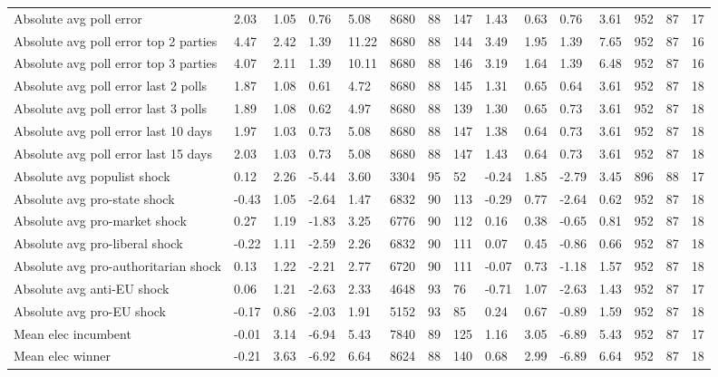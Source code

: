 \begin{longtable}{lllllllllllllll}
Absolute avg poll error & 2.03 & 1.05 & 0.76 & 5.08 & 8680 & 88 & 147 & 1.43 & 0.63 & 0.76 & 3.61 & 952 & 87 & 17\\
Absolute avg poll error top 2 parties & 4.47 & 2.42 & 1.39 & 11.22 & 8680 & 88 & 144 & 3.49 & 1.95 & 1.39 & 7.65 & 952 & 87 & 16\\
Absolute avg poll error top 3 parties & 4.07 & 2.11 & 1.39 & 10.11 & 8680 & 88 & 146 & 3.19 & 1.64 & 1.39 & 6.48 & 952 & 87 & 16\\
Absolute avg poll error last 2 polls & 1.87 & 1.08 & 0.61 & 4.72 & 8680 & 88 & 145 & 1.31 & 0.65 & 0.64 & 3.61 & 952 & 87 & 18\\
\addlinespace
Absolute avg poll error last 3 polls & 1.89 & 1.08 & 0.62 & 4.97 & 8680 & 88 & 139 & 1.30 & 0.65 & 0.73 & 3.61 & 952 & 87 & 18\\
Absolute avg poll error last 10 days & 1.97 & 1.03 & 0.73 & 5.08 & 8680 & 88 & 147 & 1.38 & 0.64 & 0.73 & 3.61 & 952 & 87 & 18\\
Absolute avg poll error last 15 days & 2.03 & 1.03 & 0.73 & 5.08 & 8680 & 88 & 147 & 1.43 & 0.64 & 0.73 & 3.61 & 952 & 87 & 18\\
Absolute avg populist shock & 0.12 & 2.26 & -5.44 & 3.60 & 3304 & 95 & 52 & -0.24 & 1.85 & -2.79 & 3.45 & 896 & 88 & 17\\
Absolute avg pro-state shock & -0.43 & 1.05 & -2.64 & 1.47 & 6832 & 90 & 113 & -0.29 & 0.77 & -2.64 & 0.62 & 952 & 87 & 18\\
\addlinespace
Absolute avg pro-market shock & 0.27 & 1.19 & -1.83 & 3.25 & 6776 & 90 & 112 & 0.16 & 0.38 & -0.65 & 0.81 & 952 & 87 & 18\\
Absolute avg pro-liberal shock & -0.22 & 1.11 & -2.59 & 2.26 & 6832 & 90 & 111 & 0.07 & 0.45 & -0.86 & 0.66 & 952 & 87 & 18\\
Absolute avg pro-authoritarian shock & 0.13 & 1.22 & -2.21 & 2.77 & 6720 & 90 & 111 & -0.07 & 0.73 & -1.18 & 1.57 & 952 & 87 & 18\\
Absolute avg anti-EU shock & 0.06 & 1.21 & -2.63 & 2.33 & 4648 & 93 & 76 & -0.71 & 1.07 & -2.63 & 1.43 & 952 & 87 & 17\\
Absolute avg pro-EU shock & -0.17 & 0.86 & -2.03 & 1.91 & 5152 & 93 & 85 & 0.24 & 0.67 & -0.89 & 1.59 & 952 & 87 & 18\\
\addlinespace
Mean elec incumbent & -0.01 & 3.14 & -6.94 & 5.43 & 7840 & 89 & 125 & 1.16 & 3.05 & -6.89 & 5.43 & 952 & 87 & 17\\
Mean elec winner & -0.21 & 3.63 & -6.92 & 6.64 & 8624 & 88 & 140 & 0.68 & 2.99 & -6.89 & 6.64 & 952 & 87 & 18\\

\end{longtable}
